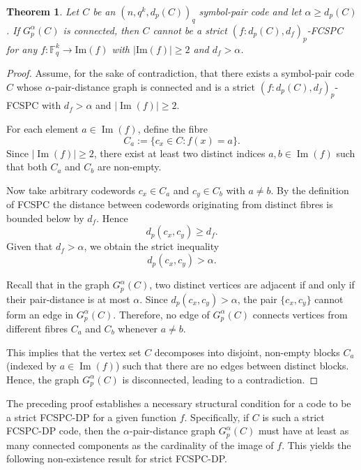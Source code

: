 \documentclass[11pt,draftclsnofoot,journal,onecolumn]{IEEEtran}
\newtheorem{theorem}{Theorem}
\begin{document}
    \begin{theorem}\label{thm:alpha-connected-nonexistence}
    Let $C$ be an $(n,q^k,d_p(C))_q$ symbol-pair code and let $\alpha\ge d_p(C)$. If $G_p^{\alpha}(C)$ is connected, then $C$ cannot be a strict $(f:d_p(C),d_f)_p$-FCSPC for any $f:\mathbb{F}_q^k\to\mathrm{Im}(f)$ with $|\mathrm{Im}(f)|\ge 2$ and $d_f>\alpha$.
    \end{theorem}

    \begin{proof}
    Assume, for the sake of contradiction, that there exists a symbol-pair code \(C\) whose $\alpha$-pair-distance graph is connected and is a strict $(f:d_p(C),d_f)_p$-FCSPC with \(d_f > \alpha\) and \(|\operatorname{Im}(f)| \ge 2\). 

    For each element \(a \in \operatorname{Im}(f)\), define the fibre
    \[
    C_a := \{c_x \in C : f(x) = a\}.
    \]
    Since \(|\operatorname{Im}(f)| \ge 2\), there exist at least two distinct indices \(a,b \in \operatorname{Im}(f)\) such that both \(C_a\) and   \(C_b\) are non-empty. 

    Now take arbitrary codewords \(c_x \in C_a\) and \(c_y \in C_b\) with \(a \neq b\). By the definition of FCSPC the distance between codewords originating from distinct fibres is bounded below by \(d_f\). Hence
    \[
    d_p(c_x, c_y) \ge d_f.
    \]
    Given that \(d_f > \alpha\), we obtain the strict inequality
    \[
    d_p(c_x, c_y) > \alpha.
    \]

    Recall that in the graph \(G_p^{\alpha}(C)\), two distinct vertices are adjacent if and only if their pair-distance is at most \(\alpha\). Since \(d_p(c_x, c_y) > \alpha\), the pair \(\{c_x, c_y\}\) cannot form an edge in \(G_p^{\alpha}(C)\). Therefore, no edge of \(G_p^{\alpha}(C)\) connects vertices from different fibres \(C_a\) and \(C_b\) whenever \(a \neq b\).

     This implies that the vertex set \(C\) decomposes into disjoint, non-empty blocks \(C_a\) (indexed by \(a \in \operatorname{Im}(f)\)) such that there are no edges between distinct blocks. Hence, the graph \(G_p^{\alpha}(C)\) is disconnected, leading to a contradiction.

    \end{proof}

    The preceding proof establishes a necessary structural condition for a code to be a strict FCSPC-DP for a given function \(f\). Specifically, if \(C\) is such a strict FCSPC-DP code, then the \(\alpha\)-pair-distance graph \(G_p^{\alpha}(C)\) must have at least as many connected components as the cardinality of the image of \(f\). This yields the following non-existence result for strict FCSPC-DP.
    
\end{document}
